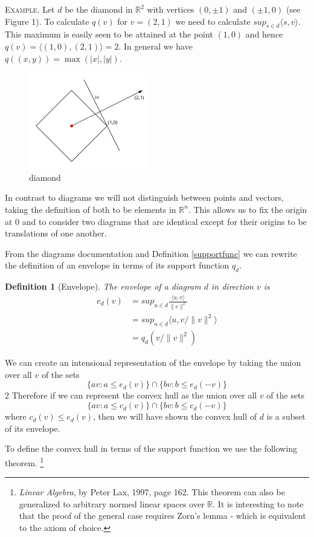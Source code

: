 \documentclass[11pt]{amsart}
\newtheorem{defn}{Definition}
\begin{document}
\textsc{Example}. Let $d$ be the diamond in $\mathbb{R}^2$ with vertices $(0, \pm1)$ and $(\pm 1, 0)$ (see Figure 1). To calculate $q(v)$ for $v = (2,1)$ 
we need to calculate $sup_{s \in d} \langle s, v \rangle$. This maximum is easily seen to be attained at the point $(1,0)$ and hence $q(v) = \langle (1,0),(2,1) \rangle = 2$. In
general we have $q((x,y)) = \max(|x|,|y|)$.

\begin{figure}[h]
\label{diamond}
\centering
\includegraphics[width=150pt]{diamond.png}
\caption{diamond}
\end{figure}

In contrast to diagrams we will not distinguish between points and vectors, taking the definition of both to be elements in $\mathbb{R}^n$.
This allows us to fix the origin at $0$ and to consider two diagrams that are identical except for their origins to be translations of one another.

From the diagrams documentation and Definition \ref{supportfunc} we can rewrite the definition of an envelope 
in terms of its support function $q_d$.
\begin{defn}[Envelope]
The envelope of a diagram $d$ in direction $v$ is
\begin{align}
e_d(v) &= sup_{u \in d} \frac{\langle u, v \rangle}{\|v\|^2}\\
           &=sup_{u \in d} \langle u, v/\|v\|^2 \rangle\\
           &=q_d(v/\|v\|^2)
\end{align}
\end{defn}

We can create an intensional representation of the envelope by taking the union over all $v$ of the sets
$$\{av : a \leq e_d(v)\} \cap \{ bv : b \leq e_d(-v)\}$$2
Therefore if we can represent the convex hull as the union over all $v$ of the sets
$$\{av : a \leq c_d(v)\} \cap \{ bv : b \leq c_d(-v)\}$$
where $c_d(v) \leq e_d(v)$, then we will have shown the convex hull of $d$ is a subset of its envelope.

To define the convex hull in terms of the support function we use the following theorem. 
\footnote{\emph{Linear Algebra}, by Peter Lax, 1997, page 162. This theorem can also be generalized to
arbitrary normed linear spaces over $\mathbb{R}$. It is interesting to note that the proof of the general case requires
Zorn's lemma - which is equivalent to the axiom of choice.}
\end{document}
